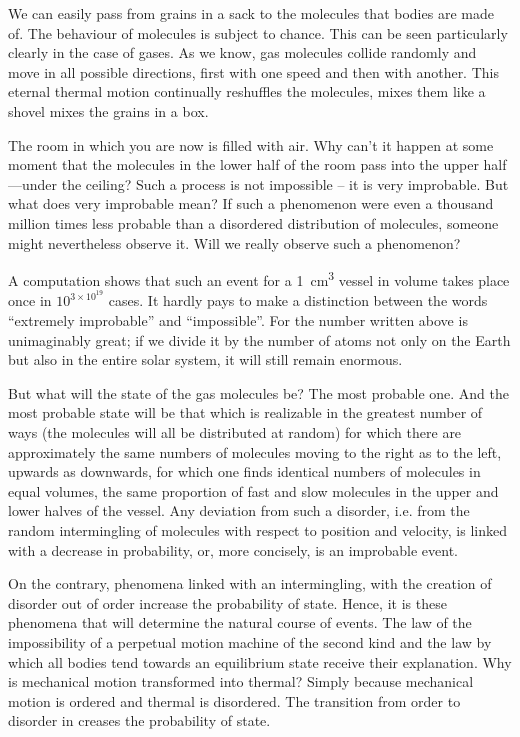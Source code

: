 We can easily pass from grains in a sack to the mole­cules that bodies are made of. The behaviour of mole­cules is subject to chance. This can be seen particularly clearly in the case of gases. As we know, gas molecules collide randomly and move in all possible directions, first with one speed and then with another. This eternal thermal motion continually reshuffles the molecules, mixes them like a shovel mixes the grains in a box.

The room in which you are now is filled with air. Why can’t it happen at some moment that the molecules in the lower half of the room pass into the upper half—under the ceiling? Such a process is not impossible -- it is very im­probable. But what does very improbable mean? If such a phenomenon were even a thousand million times less probable than a disordered distribution of molecules, someone might nevertheless observe it. Will we really observe such a phenomenon?


A computation shows that such an event for a \SI{1}{\centi\meter\cubed} vessel in volume takes place once in $10^{3 \times 10^{19}}$ cases. It hardly pays to make a distinction between the words “extremely improbable” and ``impossible''. For the num­ber written above is unimaginably great; if we divide it by the number of atoms not only on the Earth but also in the entire solar system, it will still remain enor­mous.

But what will the state of the gas molecules be? The most probable one. And the most probable state will be that which is realizable in the greatest number of ways (the molecules will all be distributed at random) for which there are approximately the same numbers of mol­ecules moving to the right as to the left, upwards as downwards, for which one finds identical numbers of molecules in equal volumes, the same proportion of fast and slow molecules in the upper and lower halves of the vessel. Any deviation from such a disorder, i.e. from the random intermingling of molecules with respect to position and velocity, is linked with a decrease in probability, or, more concisely, is an improbable event.

On the contrary, phenomena linked with an intermin­gling, with the creation of disorder out of order increase the probability of state. Hence, it is these phenomena that will determine the natural course of events. The law of the impossibility of a perpetual motion machine of the second kind and the law by which all bodies tend towards an equilibrium state receive their explanation. Why is mechanical motion transformed into thermal? Simply because mechanical motion is ordered and thermal is disordered. The transition from order to disorder in­ creases the probability of state.

